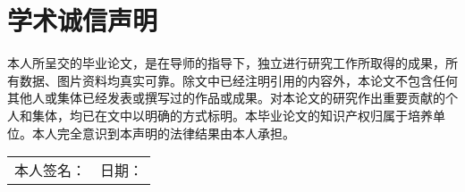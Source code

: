 ﻿\chapter{学术诚信声明}

本人所呈交的毕业论文，是在导师的指导下，独立进行研究工作所取得的成果，所有数据、图片资料均真实可靠。除文中已经注明引用的内容外，本论文不包含任何其他人或集体已经发表或撰写过的作品或成果。对本论文的研究作出重要贡献的个人和集体，均已在文中以明确的方式标明。本毕业论文的知识产权归属于培养单位。本人完全意识到本声明的法律结果由本人承担。


\bigskip

\bigskip


\begin{tabular*}{16cm}{@{\extracolsep{\fill}}lr}
本人签名：& 日期： \qquad\qquad\qquad\qquad\qquad\qquad \\
\end{tabular*}
